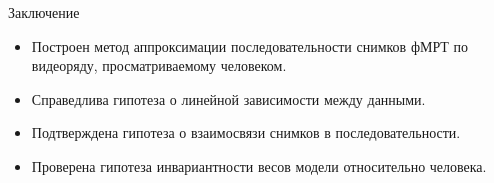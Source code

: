 \documentclass{beamer}
\begin{document}
\begin{frame}{Заключение}
    \begin{itemize}
        \item Построен метод аппроксимации последовательности снимков фМРТ по видеоряду,
              просматриваемому человеком.
        \item Справедлива гипотеза о линейной зависимости между данными.
        \item Подтверждена гипотеза о взаимосвязи снимков в последовательности.
        \item Проверена гипотеза инвариантности весов модели относительно человека.
    \end{itemize}
\end{frame}
\end{document}
